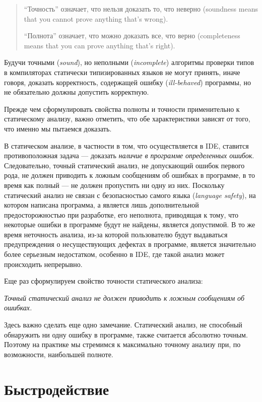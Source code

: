 \begin{quote}
``Точность'' означает, что нельзя доказать то, что неверно (soundness means that
you cannot prove anything that's wrong).

``Полнота'' означает, что можно доказать все, что верно (completeness means that
you can prove anything that's right).
\end{quote}

Будучи точными (\emph{sound}), но неполными (\emph{incomplete}) алгоритмы
проверки типов в компиляторах статически типизированных языков не
могут принять, иначе говоря, доказать корректность, содержащей ошибку (\emph{ill-behaved})
программы, но не обязательно должны допустить корректную.

Прежде чем сформулировать свойства полноты и точности применительно к
статическому анализу, важно отметить, что обе характеристики зависят от того,
что именно мы пытаемся доказать.

В статическом анализе, в частности в том, что осуществляется в IDE, ставится
противоположная задача --- доказать \emph{наличие в программе определенных
  ошибок}.  Следовательно, точный статический анализ, не допускающий ошибок
первого рода, не должен приводить к ложным сообщениям об ошибках в программе, в
то время как полный --- не должен пропустить ни одну из них. Поскольку
статический анализ не связан с безопасностью самого языка (\emph{language
  safety}), на котором написана программа, а является лишь дополнительной
предосторожностью при разработке, его неполнота, приводящая к тому, что
некоторые ошибки в программе будут не найдены, является допустимой. В то же
время неточность анализа, из-за которой пользователю будут выдаваться
предупреждения о несуществующих дефектах в программе, является значительно более
серьезным недостатком, особенно в IDE, где такой анализ может происходить
непрерывно.

Еще раз сформулируем свойство точности статического анализа:

\emph{Точный статический анализ не должен приводить к ложным сообщениям об 
ошибках.}

Здесь важно сделать еще одно замечание. Статический анализ, не способный
обнаружить ни одну ошибку в программе, также считается абсолютно точным. Поэтому
на практике мы стремимся к максимально точному анализу при, по возможности,
наибольшей полноте.

\section{Быстродействие}
\label{sec:performance-requirement}

